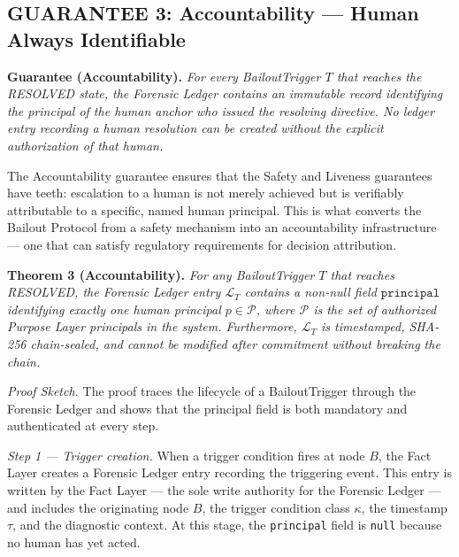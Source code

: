 \documentclass[12pt]{article}
\begin{document}
\subsection{GUARANTEE 3: Accountability — Human Always Identifiable}
\label{sec:guarantee-accountability}

\bigskip

\begin{minipage}{\linewidth}
\textbf{Guarantee (Accountability).} \textit{For every BailoutTrigger $T$ that reaches the RESOLVED state, the Forensic Ledger contains an immutable record identifying the principal of the human anchor who issued the resolving directive. No ledger entry recording a human resolution can be created without the explicit authorization of that human.}
\end{minipage}

\bigskip

The Accountability guarantee ensures that the Safety and Liveness guarantees have teeth: escalation to a human is not merely achieved but is verifiably attributable to a specific, named human principal. This is what converts the Bailout Protocol from a safety mechanism into an accountability infrastructure — one that can satisfy regulatory requirements for decision attribution.

\bigskip

\noindent\textbf{Theorem 3 (Accountability).}
\textit{For any BailoutTrigger $T$ that reaches RESOLVED, the Forensic Ledger entry $\mathcal{L}_T$ contains a non-null field $\texttt{principal}$ identifying exactly one human principal $p \in \mathcal{P}$, where $\mathcal{P}$ is the set of authorized Purpose Layer principals in the system. Furthermore, $\mathcal{L}_T$ is timestamped, SHA-256 chain-sealed, and cannot be modified after commitment without breaking the chain.}

\bigskip

\noindent\textit{Proof Sketch.} The proof traces the lifecycle of a BailoutTrigger through the Forensic Ledger and shows that the principal field is both mandatory and authenticated at every step.

\medskip

\noindent\textit{Step 1 — Trigger creation.} When a trigger condition fires at node $B$, the Fact Layer creates a Forensic Ledger entry recording the triggering event. This entry is written by the Fact Layer — the sole write authority for the Forensic Ledger — and includes the originating node $B$, the trigger condition class $\kappa$, the timestamp $\tau$, and the diagnostic context. At this stage, the \texttt{principal} field is \texttt{null} because no human has yet acted.
\end{document}
